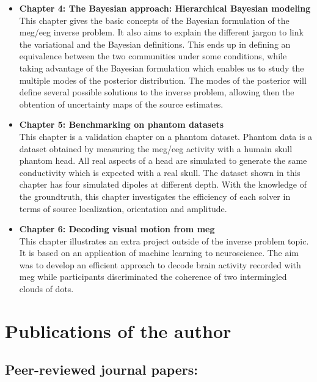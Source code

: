 \begin{itemize}

\item \textbf{Chapter 4: The Bayesian approach: Hierarchical Bayesian modeling}\\
This chapter gives the basic concepts of the Bayesian formulation of the \ac{meg}/\ac{eeg} inverse problem. It also aims to explain the different jargon to link the variational and the Bayesian definitions. This ends up in defining an equivalence between the two communities under some conditions, while taking advantage of the Bayesian formulation which enables us to study the multiple modes of the posterior distribution. The modes of the posterior will define several possible solutions to the inverse problem, allowing then the obtention of uncertainty maps of the source estimates. 

\item \textbf{Chapter 5: Benchmarking on phantom datasets}\\
This chapter is a validation chapter on a phantom dataset. Phantom data is a dataset obtained by measuring the \ac{meg}/\ac{eeg} activity with a humain skull phantom head. All real aspects of a head are simulated to generate the same conductivity which is expected with a real skull. The dataset shown in this chapter has four simulated dipoles at different depth. With the knowledge of the groundtruth, this chapter investigates the efficiency of each solver in terms of source localization, orientation and amplitude.

\item \textbf{Chapter 6: Decoding visual motion from \ac{meg}}\\
This chapter illustrates an extra project outside of the inverse problem topic. It is based on an application of machine learning to neuroscience. The aim was to develop an efficient approach to decode brain activity recorded with \ac{meg} while participants discriminated the coherence of two intermingled clouds of dots.
\end{itemize}

\newpage
\section{Publications of the author}
\subsection*{Peer-reviewed journal papers:}


